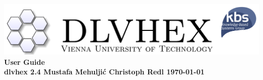 \documentclass[a4paper, titlepage]{article}
\begin{document}
\setcounter{page}{3}
\newcommand{\dlvhex}{{\sc dlvhex}}
\newcommand{\hex}{{\sc hex}}
\setcounter{secnumdepth}{4} %
\setcounter{tocdepth}{4}    %

\newtheorem{exmp}{Example}[section]


\begin{titlepage}
    \centering
    \vfill
    \includegraphics[width=1.0\textwidth,natwidth=800,natheight=800]{biglogo_whitebg.png}
    \vfill
    {\bfseries\Large
        {\large User Guide} \\
        {\small \dlvhex{} 2.4}
        \vskip4cm
        Mustafa Mehulji\'{c} \vskip1cm Christoph Redl
        \vskip4cm
        {\large \today}
    }    
    
\end{titlepage}
%
%
\begin{abstract}
This document provides a user guide for the Answer Set 
Programming (ASP) system called \dlvhex{} developed at 
Vienna University of Technology. ASP is a declarative 
problem solving paradigm, rooted in logic programming and 
nonmonotonic reasoning, which has been gaining increasing 
attention during the last years. The \dlvhex{} system is a 
reasoner for computing the models of so-called \hex{}-programs, which are an extension of \emph{answer-set 
programs} towards integration of \emph{external computation 
sources}. This guide aims at enabling users of this system 
to interoperate with a broad set of external computation 
sources. The guide refers to release 2.4.     
\end{abstract}

\tableofcontents
\newpage
\end{document}
